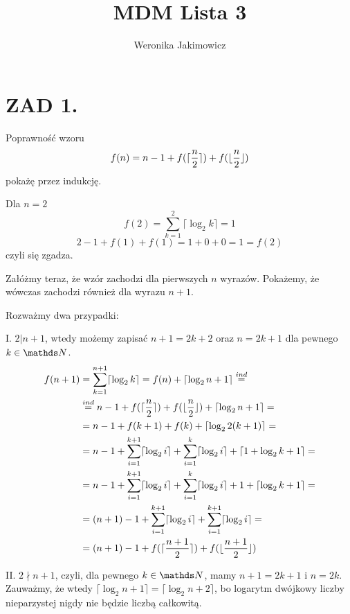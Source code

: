 \documentclass{article}[13pt]
\author{Weronika Jakimowicz}
\title{MDM Lista 3}
\date{}
\begin{document}
    \maketitle

    \section*{ZAD 1.}

    {\color{acc}Poprawność wzoru}
    $$f(n)=n-1+f(\lceil{n\over 2}\rceil)+f(\lfloor{n\over2}\rfloor)$$
    pokażę przez indukcję.
    \medskip

    Dla $n=2$
    $$f(2)=\sum\limits_{k=1}^2\lceil\log_2k\rceil=1$$
    $$2-1+f(1)+f(1)=1+0+0=1=f(2)$$
    czyli się zgadza.
    \medskip

    Załóżmy teraz, że wzór zachodzi dla pierwszych $n$ wyrazów. Pokażemy, że wówczas zachodzi również dla wyrazu $n+1$. 
    \medskip
    
    Rozważmy dwa przypadki:
    \smallskip

    I. $2|n+1$, wtedy możemy zapisać $n+1=2k+2$ oraz $n=2k+1$ dla pewnego $k\in\N$.
    \begin{align*}
        f(n+1)&=\sum\limits_{k=1}^{n+1}\lceil\log_2k\rceil=f(n)+\lceil\log_2n+1\rceil\overset{ind}{=}\\
        &\overset{ind}{=}n-1+f(\lceil{n\over2}\rceil)+f(\lfloor{n\over2}\rfloor)+\lceil\log_2n+1\rceil=\\
        &=n-1+f(k+1)+f(k)+\lceil\log_22(k+1)\rceil=\\
        &=n-1+\sum\limits_{i=1}^{k+1}\lceil\log_2i\rceil+\sum\limits_{i=1}^k\lceil\log_2i\rceil+\lceil1+\log_2k+1\rceil=\\
        &=n-1+\sum\limits_{i=1}^{k+1}\lceil\log_2i\rceil+\sum\limits_{i=1}^k\lceil\log_2i\rceil+1+\lceil\log_2k+1\rceil=\\
        &=(n+1)-1+\sum\limits_{i=1}^{k+1}\lceil\log_2i\rceil+\sum\limits_{i=1}^{k+1}\lceil\log_2i\rceil=\\
        &=(n+1)-1+f(\lceil{n+1\over2}\rceil)+f(\lfloor{n+1\over2}\rfloor)
    \end{align*}

    II. $2\nmid n+1$, czyli, dla pewnego $k\in\N$, mamy $n+1=2k+1$ i $n=2k$. Zauważmy, że wtedy $\lceil\log_2n+1\rceil=\lceil\log_2n+2\rceil$, bo logarytm dwójkowy liczby nieparzystej nigdy nie będzie liczbą całkowitą.
\end{document}

